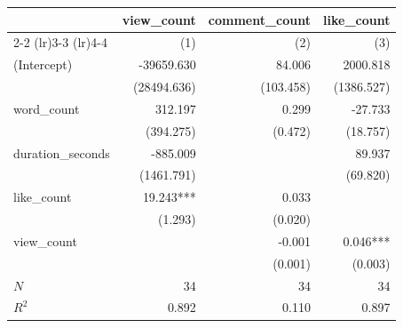 \begin{tabular}{lrrr}
\toprule
                  & \multicolumn{1}{c}{view\_count} & \multicolumn{1}{c}{comment\_count} & \multicolumn{1}{c}{like\_count} \\ 
\cmidrule(lr){2-2} \cmidrule(lr){3-3} \cmidrule(lr){4-4} 
                  &                             (1) &                                (2) &                             (3) \\ 
\midrule
(Intercept)       &                      -39659.630 &                             84.006 &                        2000.818 \\ 
                  &                     (28494.636) &                          (103.458) &                      (1386.527) \\ 
word\_count       &                         312.197 &                              0.299 &                         -27.733 \\ 
                  &                       (394.275) &                            (0.472) &                        (18.757) \\ 
duration\_seconds &                        -885.009 &                                    &                          89.937 \\ 
                  &                      (1461.791) &                                    &                        (69.820) \\ 
like\_count       &                       19.243*** &                              0.033 &                                 \\ 
                  &                         (1.293) &                            (0.020) &                                 \\ 
view\_count       &                                 &                             -0.001 &                        0.046*** \\ 
                  &                                 &                            (0.001) &                         (0.003) \\ 
\midrule
$N$               &                              34 &                                 34 &                              34 \\ 
$R^2$             &                           0.892 &                              0.110 &                           0.897 \\ 
\bottomrule
\end{tabular}
